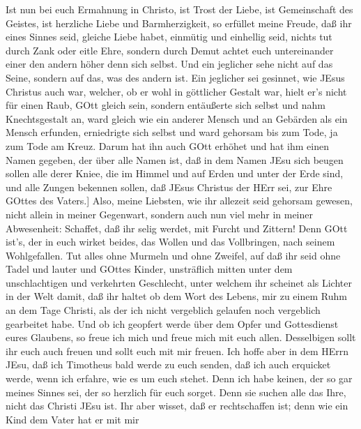  Ist nun bei euch Ermahnung in Christo, ist Trost der Liebe,
ist Gemeinschaft des Geistes, ist herzliche Liebe und Barmherzigkeit,
 so erfüllet meine Freude, daß ihr eines Sinnes seid,
gleiche Liebe habet, einmütig und einhellig seid,  nichts
tut durch Zank oder eitle Ehre, sondern durch Demut achtet euch
untereinander einer den andern höher denn sich selbst.  Und
ein jeglicher sehe nicht auf das Seine, sondern auf das, was des andern
ist.  Ein jeglicher sei gesinnet, wie JEsus Christus auch
war,  welcher, ob er wohl in göttlicher Gestalt war, hielt
er's nicht für einen Raub, GOtt gleich sein,  sondern
entäußerte sich selbst und nahm Knechtsgestalt an, ward gleich wie ein
anderer Mensch und an Gebärden als ein Mensch erfunden, 
erniedrigte sich selbst und ward gehorsam bis zum Tode, ja zum Tode am
Kreuz.  Darum hat ihn auch GOtt erhöhet und hat ihm einen
Namen gegeben, der über alle Namen ist,  daß in dem Namen
JEsu sich beugen sollen alle derer Kniee, die im Himmel und auf Erden
und unter der Erde sind,  und alle Zungen bekennen sollen,
daß JEsus Christus der HErr sei, zur Ehre GOttes des Vaters.{]}
 Also, meine Liebsten, wie ihr allezeit seid gehorsam
gewesen, nicht allein in meiner Gegenwart, sondern auch nun viel mehr in
meiner Abwesenheit: Schaffet, daß ihr selig werdet, mit Furcht und
Zittern!  Denn GOtt ist's, der in euch wirket beides, das
Wollen und das Vollbringen, nach seinem Wohlgefallen.  Tut
alles ohne Murmeln und ohne Zweifel,  auf daß ihr seid ohne
Tadel und lauter und GOttes Kinder, unsträflich mitten unter dem
unschlachtigen und verkehrten Geschlecht, unter welchem ihr scheinet als
Lichter in der Welt  damit, daß ihr haltet ob dem Wort des
Lebens, mir zu einem Ruhm an dem Tage Christi, als der ich nicht
vergeblich gelaufen noch vergeblich gearbeitet habe.  Und
ob ich geopfert werde über dem Opfer und Gottesdienst eures Glaubens, so
freue ich mich und freue mich mit euch allen.  Desselbigen
sollt ihr euch auch freuen und sollt euch mit mir freuen. 
Ich hoffe aber in dem HErrn JEsu, daß ich Timotheus bald werde zu euch
senden, daß ich auch erquicket werde, wenn ich erfahre, wie es um euch
stehet.  Denn ich habe keinen, der so gar meines Sinnes
sei, der so herzlich für euch sorget.  Denn sie suchen alle
das Ihre, nicht das Christi JEsu ist.  Ihr aber wisset, daß
er rechtschaffen ist; denn wie ein Kind dem Vater hat er mit mir
